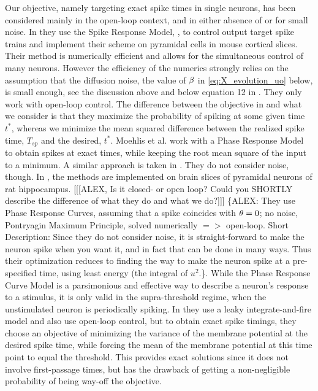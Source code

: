 \documentclass{article}
\begin{document}
Our objective, namely targeting exact spike times in single neurons, has been
considered mainly in the open-loop context, and in either absence of or for
small noise. In \cite{Ahmadian2011} they use the Spike Response Model,
\cite{Gerstner2002}, to control output target spike trains and implement their
scheme on pyramidal cells in mouse cortical slices. Their method is numerically
efficient and allows for the simultaneous control of many neurons. However the
efficiency of the numerics strongly relies on the assumption that the diffusion
noise, the value of ${\beta}$ in \cref{eq:X_evolution_uo} below, is small enough, see
the discussion above and below equation 12 in \cite{Ahmadian2011}. They only
work with open-loop control. The difference between the objective in
\cite{Ahmadian2011} and what we consider is that they maximize the probability
of spiking at some given time $t^*$, whereas we minimize the mean squared
difference between the realized spike time, $T_{sp}$ and the desired, $t^*$.
Moehlis et al. \cite{Moehlis2006} work with a Phase Response Model to obtain
spikes at exact times, while keeping the root mean square of the input to a
minimum. A similar approach is taken in \cite{Dasanayake2011}. They do not
consider noise, though. In \cite{Nabi2013}, the methods are implemented on brain
slices of pyramidal neurons of rat hippocampus. [[[ALEX, Is it closed- or open
loop? Could you SHORTLY describe the difference of what they do and what we
do?]]] \{ALEX: They use Phase Response Curves, assuming that a spike coincides
with ${\theta}=0$; no noise, Pontryagin Maximum Principle, solved numerically $=>$
open-loop. Short Description: Since they do not consider noise, it is
straight-forward to make the neuron spike when you want it, and in fact that can
be done in many ways. Thus their optimization reduces to finding the way to make
the neuron spike at a pre-specified time, using least energy (the integral of
$u^2$.\}. While the Phase Response Curve Model is a parsimonious and effective
way to describe a neuron's response to a stimulus, it is only valid in the
supra-threshold regime, when the unstimulated neuron is periodically spiking.
In \cite{Feng2003} they use a leaky integrate-and-fire model and also
use open-loop control, but to obtain exact spike timings, they choose an
objective of minimizing the variance of the membrane potential at the desired
spike time, while forcing the mean of the membrane potential at this time point
to equal the threshold. This provides exact solutions since it does not involve
first-passage times, but has the drawback of getting a non-negligible
probability of being way-off the objective.
\end{document}
